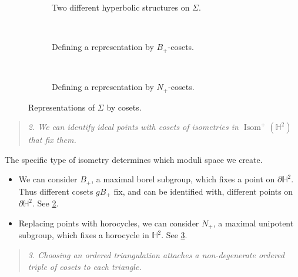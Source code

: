 \documentclass{amsart}
\theoremstyle{plain}
\theoremstyle{definition}
\theoremstyle{remark}
\DeclareMathOperator{\Isom}{Isom}
\begin{document}
  \begin{figure}[h]
    \centering
    \begin{subfigure}[t]{0.25\textwidth}
      \centering 

      \caption{Two different hyperbolic structures on $\Sigma$.
        \label{fig:sigma-3}
      }
    \end{subfigure}
    ~ \hspace{0.05\textwidth} ~
    \begin{subfigure}[t]{0.25\textwidth}
      \centering 

      \caption{Defining a representation by $B_{+}$-cosets.
        \label{fig:sigma-6}
      }
    \end{subfigure}
    ~ \hspace{0.05\textwidth} ~
    \begin{subfigure}[t]{0.25\textwidth}
      \centering 

      \caption{Defining a representation by $N_{+}$-cosets.
        \label{fig:sigma-5}
      }
    \end{subfigure}
    \caption{Representations of $\Sigma$ by cosets.
      \label{fig:rho-by-flags}
    }
  \end{figure}

  \begin{quote}
    \emph{2. We can identify ideal points with cosets of isometries in
      $\Isom^{+}(\mathbb{H}^2)$ that fix them.}
  \end{quote}

  The specific type of isometry determines which moduli space we create.
  \begin{itemize}
  \item
    We can consider $B_{+}$, a maximal borel subgroup, which fixes a
    point on $\partial \mathbb{H}^2$. Thus different cosets $g B_{+}$
    fix, and can be identified with, different points on $\partial
    \mathbb{H}^2$. See \cref{fig:sigma-6}.
  \item
    Replacing points with horocycles, we can consider $N_{+}$, a maximal
    unipotent subgroup, which fixes a horocycle in $\mathbb{H}^2$. See
    \cref{fig:sigma-5}.
  \end{itemize}

  \begin{quote}
    \emph{3. Choosing an ordered triangulation attaches a non-degenerate
      ordered triple of cosets to each triangle.}
  \end{quote}
\end{document}
